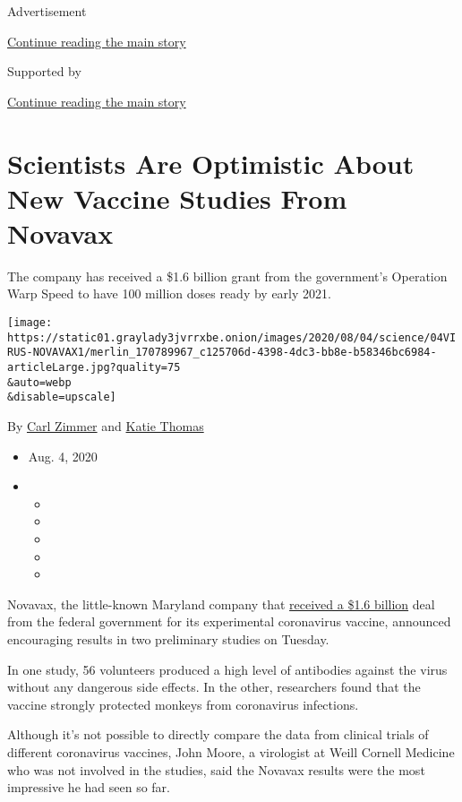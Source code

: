 Advertisement

\protect\hyperlink{after-top}{Continue reading the main story}

Supported by

\protect\hyperlink{after-sponsor}{Continue reading the main story}

\hypertarget{scientists-are-optimistic-about-new-vaccine-studies-from-novavax}{%
\section{Scientists Are Optimistic About New Vaccine Studies From
Novavax}\label{scientists-are-optimistic-about-new-vaccine-studies-from-novavax}}

The company has received a \$1.6 billion grant from the government's
Operation Warp Speed to have 100 million doses ready by early 2021.

\texttt{[image: https://static01.graylady3jvrrxbe.onion/images/2020/08/04/science/04VIRUS-NOVAVAX1/merlin\_170789967\_c125706d-4398-4dc3-bb8e-b58346bc6984-articleLarge.jpg?quality=75\\\&auto=webp\\\&disable=upscale]}

By \href{https://www.nytimes3xbfgragh.onion/by/carl-zimmer}{Carl Zimmer}
and \href{https://www.nytimes3xbfgragh.onion/by/katie-thomas}{Katie
Thomas}

\begin{itemize}
\item
  Aug. 4, 2020
\item
  \begin{itemize}
  \item
  \item
  \item
  \item
  \item
  \end{itemize}
\end{itemize}

Novavax, the little-known Maryland company that
\href{https://www.nytimes3xbfgragh.onion/2020/07/16/health/coronavirus-vaccine-novavax.html}{received
a \$1.6 billion} deal from the federal government for its experimental
coronavirus vaccine, announced encouraging results in two preliminary
studies on Tuesday.

In one study, 56 volunteers produced a high level of antibodies against
the virus without any dangerous side effects. In the other, researchers
found that the vaccine strongly protected monkeys from coronavirus
infections.

Although it's not possible to directly compare the data from clinical
trials of different coronavirus vaccines, John Moore, a virologist at
Weill Cornell Medicine who was not involved in the studies, said the
Novavax results were the most impressive he had seen so far.

